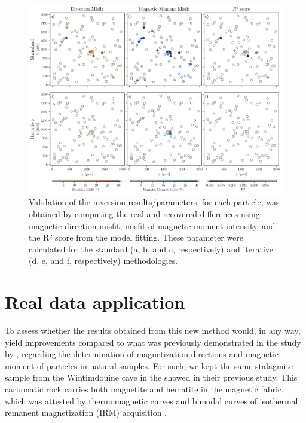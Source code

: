 \begin{figure}[tb!]
  \centering
  \includegraphics[width=1\linewidth]{figures/inversion-comparion-2.png}
  \caption{Validation of the inversion results/parameters, for each particle, was obtained by computing the real and recovered differences using magnetic direction misfit, misfit of magnetic moment intensity, and the R² score from the model fitting. These parameter were calculated for the standard (a, b, and c, respectively) and iterative (d, e, and f, respectively) methodologies.}
  \label{inversion2}
\end{figure}

\section{Real data application}

To assess whether the results obtained from this new method would, in any way, yield improvements compared to what was previously demonstrated in the study by \citet{Souza-Junior2023b}, regarding the determination of magnetization directions and magnetic moment of particles in natural samples. For such, we kept the same stalagmite sample from the Wintimdouine cave in the  \citep[Agadir (Morocco),][]{Ait2019Hydro} showed in their previous study. This carbonatic rock carries both magnetite and hematite in the magnetic fabric, which was attested by thermomagnetic curves and bimodal curves of isothermal remanent magnetization (IRM) acquisition \citep{carmo2019speleothem}.

